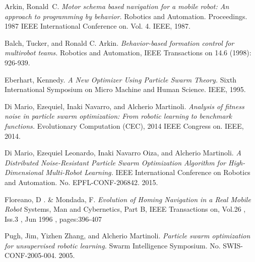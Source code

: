 \documentclass[journal]{IEEEtran}
\begin{document}
%
%
%
\begin{thebibliography}{1}

Arkin, Ronald~C. \emph{Motor schema based navigation for a mobile
  robot: An approach to programming by behavior.} 
Robotics and Automation. Proceedings. 1987 IEEE International Conference on. Vol. 4. IEEE, 1987.

Balch, Tucker, and Ronald C. Arkin. \emph{Behavior-based formation
  control for multirobot teams.}
 Robotics and Automation, IEEE Transactions on 14.6 (1998): 926-939.
 
Eberhart, Kennedy. \emph{A New Optimizer Using Particle Swarm Theory.}
 Sixth International Symposium on Micro Machine and Human Science. IEEE, 1995.

Di Mario, Ezequiel, Inaki Navarro, and Alcherio
Martinoli. \emph{Analysis of fitness noise in particle swarm
  optimization: From robotic learning to benchmark functions.}
 Evolutionary Computation (CEC), 2014 IEEE Congress on. IEEE, 2014.

Di Mario, Ezequiel Leonardo, Inaki Navarro Oiza, and Alcherio
Martinoli. 
\emph{A Distributed Noise-Resistant Particle Swarm Optimization
  Algorithm for High-Dimensional Multi-Robot Learning.}
 IEEE International Conference on Robotics and Automation. No. EPFL-CONF-206842. 2015.

Floreano, D . \& Mondada, F. \emph{Evolution of Homing Navigation in a Real
Mobile Robot} Systems, Man and Cybernetics, Part B, IEEE Transactions
on, Vol.26 , Iss.3 , Jun 1996 , pages:396-407

Pugh, Jim, Yizhen Zhang, and Alcherio Martinoli. \emph{Particle swarm
  optimization for unsupervised robotic learning.}
 Swarm Intelligence Symposium. No. SWIS-CONF-2005-004. 2005.

\end{thebibliography}
\end{document}
